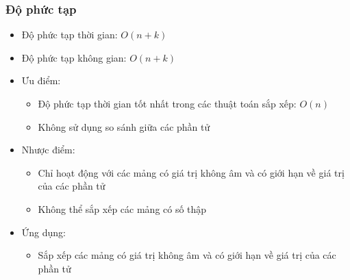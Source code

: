 \subsubsection{Độ phức tạp}

\begin{itemize}
    \item Độ phức tạp thời gian: $O(n + k)$
    \item Độ phức tạp không gian: $O(n + k)$
    \item Ưu điểm:
        \begin{itemize}
            \item Độ phức tạp thời gian tốt nhất trong các thuật toán sắp xếp: $O(n)$
            \item Không sử dụng so sánh giữa các phần tử
        \end{itemize}
    \item Nhược điểm:
        \begin{itemize}
            \item Chỉ hoạt động với các mảng có giá trị không âm và có giới hạn về giá trị của các phần tử
            \item Không thể sắp xếp các mảng có số thập
        \end{itemize}
    \item Ứng dụng:
        \begin{itemize}
            \item Sắp xếp các mảng có giá trị không âm và có giới hạn về giá trị của các phần tử
        \end{itemize}
\end{itemize}
